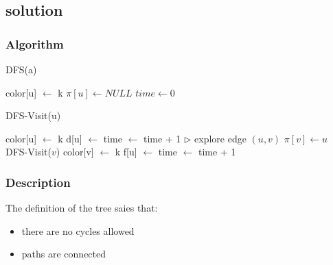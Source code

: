 \subsection{solution}

\subsubsection{Algorithm}
\begin{algorithm}[ht]
\small
\caption{DFS(a)}
\begin{algorithmic}
       \STATE color[u] $\gets$ k
       \STATE $\pi[u] \gets NULL$
    \ENDFOR
    \STATE $time \gets 0$
\end{algorithmic}
\end{algorithm}

\begin{algorithm}[ht]
\small
\caption{DFS-Visit(u)}
\begin{algorithmic}
    \STATE color[u] $\gets$ k
    \STATE d[u] $\gets$ time $\gets$ time + 1
       \STATE $\triangleright$ explore edge $(u,v)$
           \STATE $\pi[v] \gets u$
           \STATE DFS-Visit($v$)
       \ENDIF
     \ENDFOR
     \STATE color[v] $\gets$  k
     \STATE f[u] $\gets$ time $\gets$ time + 1
\end{algorithmic}
\end{algorithm}


\subsubsection{Description}
The definition of the tree saies that:
\begin{itemize}
 \item there are no cycles allowed
 \item paths are connected
\end{itemize}
